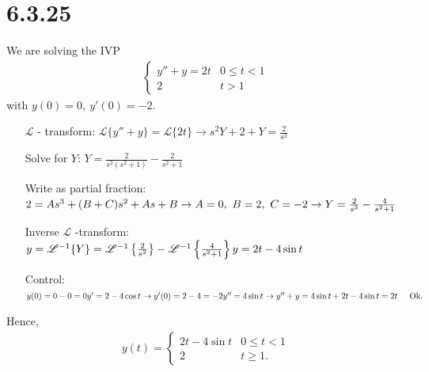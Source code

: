 \documentclass[11pt,a4paper]{article}
\newcommand{\Laplace}{\mathscr{L}}
\begin{document}
\section*{6.3.25}
We are solving the IVP
\begin{align*}
	\left\{\begin{matrix}
	y'' + y = 2t & 0 \leq t < 1 \\ 
	2 & t > 1 
	\end{matrix}\right.
\end{align*}
with $y(0) = 0,\ y'(0) = -2$.
\begin{itemize}[leftmargin=4.0cm,labelsep=0.5cm]
\item[$\Laplace$ - transform:]
	$\Laplace\{y'' + y\} = \Laplace\{2t\} 
	\rightarrow s^2Y + 2 + Y = \frac{2}{s^2}$
\item[Solve for $Y$:]
	$Y = \frac{2}{s^2(s^2+1)} - \frac{2}{s^2+1}$
\item[Write as partial fraction:]
	$2 = As^3 + (B+C)s^2 + As + B \\
	\rightarrow A = 0,\ B = 2,\ C = -2 \\
	\rightarrow Y = \frac{2}{s^2} - \frac{4}{s^2+1}$
\item[Inverse $\Laplace$ -transform:]
	$y = \Laplace^{-1}\{Y\}
	= \Laplace^{-1}\left\{\frac{2}{s^2}\right\} - \Laplace^{-1}\left\{\frac{4}{s^2+1}\right\} \\
	y = 2t - 4\sin t$
\item[Control:]
	$y(0) = 0 - 0 = 0 \\
	y' = 2 - 4 \cos t \\
	\rightarrow y'(0) = 2 - 4 = -2 \\
	y'' = 4 \sin t \\
	\rightarrow y'' + y = 4 \sin t + 2t - 4 \sin t = 2t
	\hspace*{0.5cm} \text{Ok.}$
\end{itemize}
Hence,
\begin{align*}
	y(t) = 
	\left\{\begin{matrix}
	2t - 4 \sin t & 0 \leq t < 1 \\ 
	2 & t \geq 1.
	\end{matrix}\right.
\end{align*}
\end{document}
